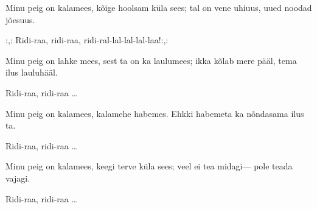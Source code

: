Minu peig on kalamees,
k\~oige hoolsam k\"ula sees;
tal on vene uhiuus,
uued noodad j\~oesuus.

:,: Ridi-raa, ridi-raa,
ridi-ral-lal-lal-lal-laa!:,: 

Minu peig on lahke mees,
sest ta on ka laulumees;
ikka k\~olab mere p\"a\"al,
tema ilus lauluh\"a\"al.

Ridi-raa, ridi-raa \ldots

Minu peig on kalamees,
kalamehe habemes.
Ehkki habemeta ka
n\~ondasama ilus ta.

Ridi-raa, ridi-raa \ldots

Minu peig on kalamees,
keegi terve k\"ula sees;
veel ei tea midagi---
pole teada vajagi.

Ridi-raa, ridi-raa \ldots